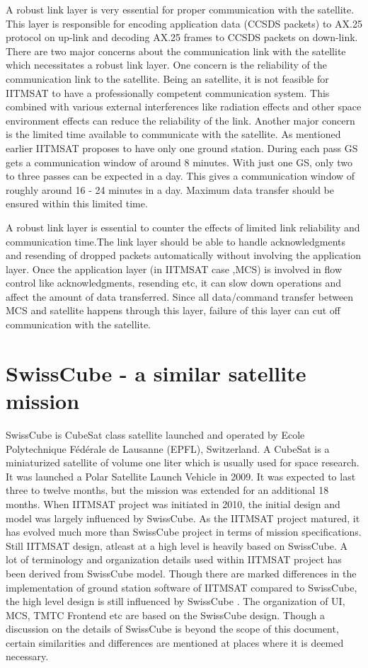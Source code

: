 \documentclass[BTech]{iitmdiss}
\begin{document}
A robust link layer is very essential for proper communication with the satellite. This layer is responsible for encoding application data (CCSDS packets) to AX.25 protocol on up-link and decoding  AX.25 frames to CCSDS packets on down-link. There are two major concerns about the communication link with the satellite which necessitates a robust link layer. One concern is the reliability of the communication link to the satellite. Being an  satellite, it is not feasible for IITMSAT to have a professionally competent communication system. This combined with various external interferences like radiation effects and other space environment effects can reduce the reliability of the link. Another major concern is the limited time available to communicate with the satellite. As mentioned earlier IITMSAT proposes to have only one ground station. During each pass GS gets a communication window of around 8 minutes. With just one GS, only two to three passes can be expected in a day. This gives a communication window of roughly around 16 - 24 minutes in a day. Maximum data transfer should be ensured within this limited time. 
\par A robust link layer is essential to counter the effects of limited link reliability and communication time.The link layer should be able to handle acknowledgments and resending of dropped packets automatically without involving the application layer. Once the application layer (in IITMSAT case ,MCS) is involved in flow control like acknowledgments, resending etc, it can slow down operations and affect the amount of data transferred. Since all data/command transfer between MCS and satellite happens through this layer, failure of this layer can cut off communication with the satellite.

\section{SwissCube - a similar satellite mission}
SwissCube is CubeSat class satellite launched and operated by Ecole Polytechnique Fédérale de Lausanne (EPFL), Switzerland. A CubeSat is a miniaturized satellite of volume one liter which is usually used for space research. It was launched a Polar Satellite Launch Vehicle in 2009. It was expected to last three to twelve months, but the mission was extended for an additional 18 months.
When IITMSAT project was initiated in 2010, the initial design and model was largely influenced by SwissCube. As the IITMSAT project matured, it has evolved much more than SwissCube project in terms of mission specifications. Still IITMSAT design, atleast at a high level is heavily based on SwissCube. A lot of terminology and organization details used within IITMSAT project has been derived from SwissCube model.
Though there are marked differences in the implementation of ground station software of IITMSAT compared to SwissCube, the high level design is still influenced by SwissCube . The organization of UI, MCS, TMTC Frontend etc are based on the SwissCube design.  Though a discussion on the details of SwissCube is beyond the scope of this document, certain similarities and differences are mentioned at places where it is deemed necessary.  
\end{document}
